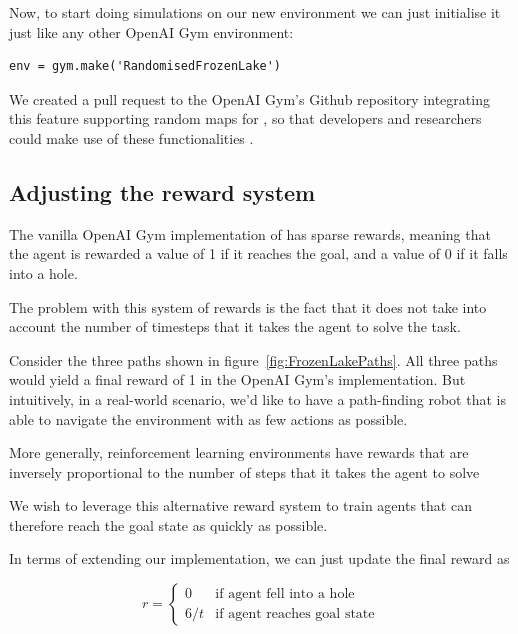 Now, to start doing simulations on our new environment we can just initialise it just like any other OpenAI Gym environment:

\begin{minipage}{\linewidth}
\lstset{language=Python}
\lstset{basicstyle=\footnotesize}
\begin{lstlisting}
env = gym.make('RandomisedFrozenLake')
\end{lstlisting}
\end{minipage}

We created a pull request to the OpenAI Gym's Github repository integrating this feature supporting random maps for , so that developers and researchers could make use of these functionalities \parencite{Addabili86:online}.

\subsection{Adjusting the reward system}
\label{sec:adjrewardsys}
The vanilla OpenAI Gym implementation of  has sparse rewards, meaning that the agent is rewarded a value of 1 if it reaches the goal, and a value of 0 if it falls into a hole.

The problem with this system of rewards is the fact that it does not take into account the number of timesteps that it takes the agent to solve the task.

Consider the three paths shown in figure~\ref{fig:FrozenLakePaths}. All three paths would yield a final reward of 1 in the OpenAI Gym's implementation. But intuitively, in a real-world scenario, we'd like to have a path-finding robot that is able to navigate the environment with as few actions as possible.

More generally, reinforcement learning environments have rewards that are inversely proportional to the number of steps that it takes the agent to solve \citep{bellemare2013arcade, 1606.01540, zamora2016extending}

We wish to leverage this alternative reward system to train agents that can therefore reach the goal state as quickly as possible.

In terms of extending our  implementation, we can just update the final reward as 

\[
r =
\left\{
	\begin{array}{ll}
		0   & \mbox{if agent fell into a hole}\\
		6/t & \mbox{if agent reaches goal state}
	\end{array}
\right.
\]

